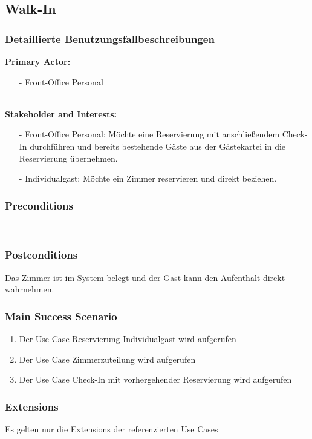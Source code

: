 \documentclass[./detailed_overview_usecases.tex]{subfiles}
\begin{document}
    \subsection{Walk-In}
    \subsubsection{Detaillierte Benutzungsfallbeschreibungen}

    \textbf{Primary Actor: }
    \begin{itemize}
        \item [-] Front-Office Personal
    \end{itemize}
    \\
    \textbf{Stakeholder and Interests:}
    \begin{itemize}
        \item[-] Front-Office Personal: Möchte eine Reservierung mit anschließendem Check-In durchführen und bereits bestehende Gäste aus der Gästekartei in die Reservierung übernehmen.
        \item[-] Individualgast: Möchte ein Zimmer reservieren und direkt beziehen.
    \end{itemize}

    \subsubsection*{Preconditions}
    -

    \subsubsection*{Postconditions}
    Das Zimmer ist im System belegt und der Gast kann den Aufenthalt direkt wahrnehmen.

    \subsubsection*{Main Success Scenario}
    \begin{enumerate}
        \item Der Use Case Reservierung Individualgast wird aufgerufen
        \item Der Use Case Zimmerzuteilung wird aufgerufen
        \item Der Use Case Check-In mit vorhergehender Reservierung wird aufgerufen
    \end{enumerate}

    \subsubsection*{Extensions}
    Es gelten nur die Extensions der referenzierten Use Cases
\end{document}
